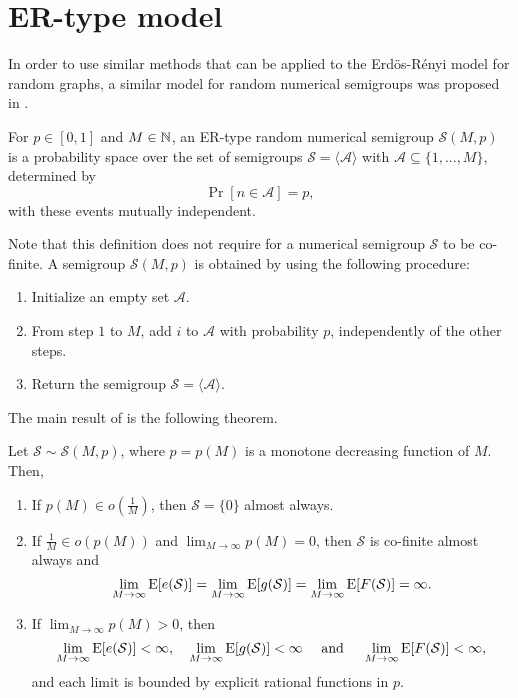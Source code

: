 \section{ER-type model}

In order to use similar methods that can be applied to the Erdös-Rényi model for random graphs, a similar model for random numerical semigroups was proposed in \cite{de2018random}. 

\begin{definition}
    For $p \in [0, 1]$ and $M \in \mathbb{N}$, an ER-type random numerical semigroup $\mathcal{S}(M, p)$ is a probability space over the set of semigroups $\mathcal{S} = \langle\mathcal{A}\rangle$ with $\mathcal{A} \subseteq \{1,...,M\}$, determined by
    \[\Pr[n \in \mathcal{A}] = p,\]
    with these events mutually independent.
\end{definition}
Note that this definition does not require for a numerical semigroup $\mathcal{S}$ to be co-finite. A semigroup $\mathcal{S}(M, p)$ is obtained by using the following procedure:
\begin{enumerate}
    \item Initialize an empty set $\mathcal{A}$.
    \item From step $1$ to $M$, add $i$ to $\mathcal{A}$ with probability $p$, independently of the other steps.
    \item Return the semigroup $\mathcal{S} = \langle\mathcal{A}\rangle$.
\end{enumerate}

The main result of \cite{de2018random} is the following theorem.  

\begin{theorem}\label{thm:ermodel} Let $\mathcal{S} \sim \mathcal{S}(M, p)$, where $p = p(M)$ is a monotone decreasing function of $M$. Then, 
    \begin{enumerate}[label=(\alph*)]
        \item If $p(M) \in o\left(\frac{1}{M}\right)$, then $\mathcal{S} = \{0\}$ almost always.
        \item If $\frac{1}{M} \in o(p(M))$ and $\lim_{M \to \infty} p(M)= 0$, then $\mathcal{S}$ is co-finite almost always and
         \[\lim_{M \to  \infty} \mathrm{E}[e(\mathcal{S})] = \lim_{M \to \infty} \mathrm{E}[g(\mathcal{S})] = \lim_{M \to \infty} \mathrm{E}[F(\mathcal{S})] = \infty.\]
        \item If $\lim_{M \to \infty} p(M) > 0$, then
        \[\lim_{M \to \infty} \mathrm{E}[e(\mathcal{S})] < \infty,  \quad \lim_{M \to \infty} \mathrm{E}[g(\mathcal{S})] < \infty \quad  \text{ and } \quad \lim_{M \to \infty} \mathrm{E}[F(\mathcal{S})]< \infty,\]
        and each limit is bounded by explicit rational functions in $p$.
    \end{enumerate}
\end{theorem}

